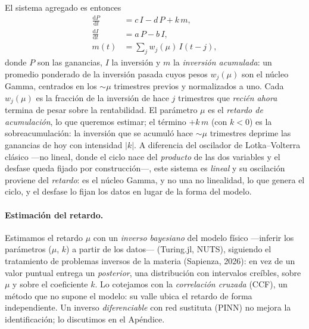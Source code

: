 \documentclass[11pt]{article}
\begin{document}
El sistema agregado es entonces
\begin{equation}
\begin{aligned}
\frac{\mathrm{d}P}{\mathrm{d}t} &= c\,I - d\,P + k\,m,\\
\frac{\mathrm{d}I}{\mathrm{d}t} &= a\,P - b\,I,\\
m(t) &= \sum_j w_j(\mu)\,I(t-j),
\end{aligned}
\end{equation}
donde $P$ son las ganancias, $I$ la inversión y $m$ la \emph{inversión acumulada}: un promedio
ponderado de la inversión pasada cuyos pesos $w_j(\mu)$ son el núcleo Gamma, centrados en los
$\sim\mu$ trimestres previos y normalizados a uno. Cada $w_j(\mu)$ es la fracción de la inversión de
hace $j$ trimestres que \emph{recién ahora} termina de pesar sobre la rentabilidad. El parámetro
$\mu$ es el \emph{retardo de acumulación}, lo que queremos estimar; el término $+k\,m$ (con $k<0$) es la
sobreacumulación: la inversión que se acumuló hace $\sim\mu$ trimestres deprime las ganancias de hoy
con intensidad $|k|$. A diferencia del oscilador de Lotka--Volterra clásico ---no lineal, donde el
ciclo nace del \emph{producto} de las dos variables y el desfase queda fijado por construcción---,
este sistema es \emph{lineal} y su oscilación proviene del \emph{retardo}: es el núcleo Gamma, y no
una no linealidad, lo que genera el ciclo, y el desfase lo fijan los datos en lugar de la forma del
modelo.

\paragraph{Estimación del retardo.} Estimamos el retardo $\mu$ con un \emph{inverso bayesiano} del modelo físico ---inferir los
parámetros ($\mu$, $k$) a partir de los datos--- (Turing.jl, NUTS), siguiendo el tratamiento de
problemas inversos de la materia (Sapienza, 2026): en vez de un valor puntual
entrega un \emph{posterior}, una distribución con intervalos creíbles, sobre $\mu$ y sobre el
coeficiente $k$. Lo cotejamos con la \emph{correlación cruzada} (CCF), un método que no supone el
modelo: su valle ubica el retardo de forma independiente. Un inverso \emph{diferenciable} con red
sustituta (PINN) no mejora la identificación; lo discutimos en el Apéndice.
\end{document}
